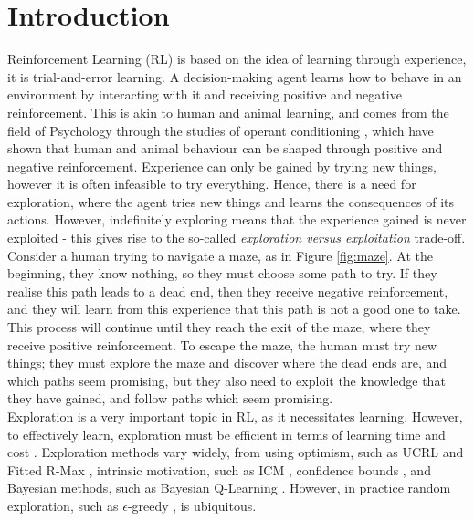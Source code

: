 
\chapter{Introduction}

\label{chapter1}

Reinforcement Learning (RL) \citep{Sutton1998} is based on the idea of learning through experience, it is trial-and-error learning. A decision-making agent learns how to behave in an environment by interacting with it and receiving positive and negative reinforcement. This is akin to human and animal learning, and comes from the field of Psychology through the studies of operant conditioning \citep{nla.cat-vn2770732}, which have shown that human and animal behaviour can be shaped through positive and negative reinforcement. Experience can only be gained by trying new things, however it is often infeasible to try everything. Hence, there is a need for exploration, where the agent tries new things and learns the consequences of its actions. However, indefinitely exploring means that the experience gained is never exploited - this gives rise to the so-called \textit{exploration versus exploitation} trade-off.
\\Consider a human trying to navigate a maze, as in Figure \ref{fig:maze}. At the beginning, they know nothing, so they must choose some path to try. If they realise this path leads to a dead end, then they receive negative reinforcement, and they will learn from this experience that this path is not a good one to take. This process will continue until they reach the exit of the maze, where they receive positive reinforcement. To escape the maze, the human must try new things; they must explore the maze and discover where the dead ends are, and which paths seem promising, but they also need to exploit the knowledge that they have gained, and follow paths which seem promising.
\\Exploration is a very important topic in RL, as it necessitates learning. However, to effectively learn, exploration must be efficient in terms of learning time and cost \citep{Thrun-1992-15850}.
Exploration methods vary widely, from using optimism, such as UCRL \citep{NIPS2006_c1b70d96} and Fitted R-Max \citep{SARA07-jong}, intrinsic motivation, such as ICM \citep{DBLP:journals/corr/PathakAED17}, confidence bounds \citep{10.5555/911176}, and Bayesian methods, such as Bayesian Q-Learning \citep{10.5555/944919.944941}. However, in practice random exploration, such as $\epsilon$-greedy \citep{Watkins:1989, conf/nips/Sutton95}, is ubiquitous.
